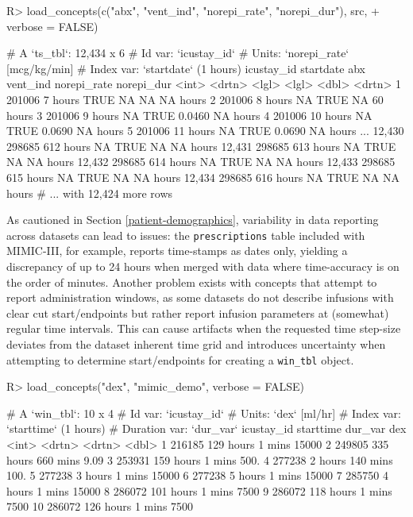 \documentclass[
  notitle]{jss}
\begin{document}
\begin{CodeChunk}
\begin{CodeInput}
R> load_concepts(c("abx", "vent_ind", "norepi_rate", "norepi_dur"), src,
+               verbose = FALSE)
\end{CodeInput}
\begin{CodeOutput}
# A `ts_tbl`: 12,434 x 6
# Id var:     `icustay_id`
# Units:      `norepi_rate` [mcg/kg/min]
# Index var:  `startdate` (1 hours)
       icustay_id startdate abx   vent_ind norepi_rate norepi_dur
            <int> <drtn>    <lgl> <lgl>          <dbl> <drtn>
     1     201006   7 hours TRUE  NA           NA      NA hours
     2     201006   8 hours NA    TRUE         NA      60 hours
     3     201006   9 hours NA    TRUE          0.0460 NA hours
     4     201006  10 hours NA    TRUE          0.0690 NA hours
     5     201006  11 hours NA    TRUE          0.0690 NA hours
   ...
12,430     298685 612 hours NA    TRUE         NA      NA hours
12,431     298685 613 hours NA    TRUE         NA      NA hours
12,432     298685 614 hours NA    TRUE         NA      NA hours
12,433     298685 615 hours NA    TRUE         NA      NA hours
12,434     298685 616 hours NA    TRUE         NA      NA hours
# ... with 12,424 more rows
\end{CodeOutput}
\end{CodeChunk}

As cautioned in Section \ref{patient-demographics}, variability in data
reporting across datasets can lead to issues: the \texttt{prescriptions}
table included with MIMIC-III, for example, reports time-stamps as dates
only, yielding a discrepancy of up to 24 hours when merged with data
where time-accuracy is on the order of minutes. Another problem exists
with concepts that attempt to report administration windows, as some
datasets do not describe infusions with clear cut start/endpoints but
rather report infusion parameters at (somewhat) regular time intervals.
This can cause artifacts when the requested time step-size deviates from
the dataset inherent time grid and introduces uncertainty when
attempting to determine start/endpoints for creating a \texttt{win\_tbl}
object.

\begin{CodeChunk}
\begin{CodeInput}
R> load_concepts("dex", "mimic_demo", verbose = FALSE)
\end{CodeInput}
\begin{CodeOutput}
# A `win_tbl`:  10 x 4
# Id var:       `icustay_id`
# Units:        `dex` [ml/hr]
# Index var:    `starttime` (1 hours)
# Duration var: `dur_var`
   icustay_id starttime dur_var       dex
        <int> <drtn>    <drtn>      <dbl>
 1     216185 129 hours   1 mins 15000
 2     249805 335 hours 660 mins     9.09
 3     253931 159 hours   1 mins   500.
 4     277238   2 hours 140 mins   100.
 5     277238   3 hours   1 mins 15000
 6     277238   5 hours   1 mins 15000
 7     285750   4 hours   1 mins 15000
 8     286072 101 hours   1 mins  7500
 9     286072 118 hours   1 mins  7500
10     286072 126 hours   1 mins  7500
\end{CodeOutput}
\end{CodeChunk}
\end{document}
